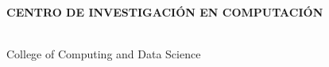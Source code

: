 \makeatletter
\begin{titlepage}
\begin{center}

\uppercase{\textbf{\large{Centro de investigación en Computación}}}
\\[7cm]

\uppercase{\textbf{\large{\@title}}}

\vfill
\@author
\\[3cm]

College of Computing and Data Science

\@date

\end{center}
\end{titlepage}
\makeatother